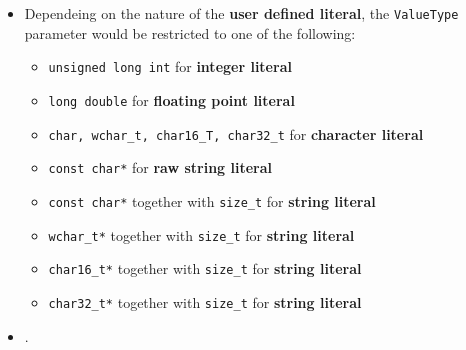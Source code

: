 \documentclass[10pt]{article}
\begin{document}
\begin{tcolorbox}
	\begin{itemize}
		\item Dependeing on the nature of the \textbf{user defined literal}, the \verb|ValueType| parameter would be restricted to one of the following:
			\begin{itemize}
				\item \verb|unsigned long int| for \textbf{integer literal}
				\item \verb|long double| for \textbf{floating point literal}
				\item \verb|char, wchar_t, char16_T, char32_t| for \textbf{character literal}
				\item \verb|const char*| for \textbf{raw string literal}
				\item \verb|const char*| together with \verb|size_t| for \textbf{string literal}
				\item \verb|wchar_t*| together with \verb|size_t| for \textbf{string literal}
				\item \verb|char16_t*| together with \verb|size_t| for \textbf{string literal}
				\item \verb|char32_t*| together with \verb|size_t| for \textbf{string literal}
			\end{itemize}
	\end{itemize}
\end{tcolorbox}

\begin{itemize}
	\item {}.
\end{itemize}

\newpage
\end{document}
